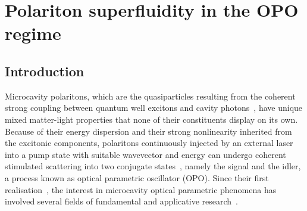 

\chapter{Polariton superfluidity in the OPO regime}
\label{cha:opo}


\section{Introduction}
%
Microcavity polaritons, which are the quasiparticles resulting from
the coherent strong coupling between quantum well excitons and cavity
photons~\cite{9780199228942}, have unique mixed matter-light
properties that none of their constituents display on its own. Because
of their energy dispersion and their strong nonlinearity inherited
from the excitonic components, polaritons continuously injected by an
external laser into a pump state with suitable wavevector and energy
can undergo coherent stimulated scattering into two conjugate
states~\cite{Ciuti_2000,Ciuti_2001,Ciuti_2003}, namely the signal and
the idler, a process known as optical parametric oscillator (OPO).
%
Since their first
realisation~\cite{Stevenson_2000,Savvidis_2000,Savvidis_2000_b,Baumberg_2000,Saba_2001},
the interest in microcavity optical parametric phenomena has involved
several fields of fundamental and applicative
research~\cite{Edamatsu_2004,Savasta_2005,Lanco_2006,Abbarchi_2011,Ardizzone_2012,Xie_2012,Lecomte_2013}.

